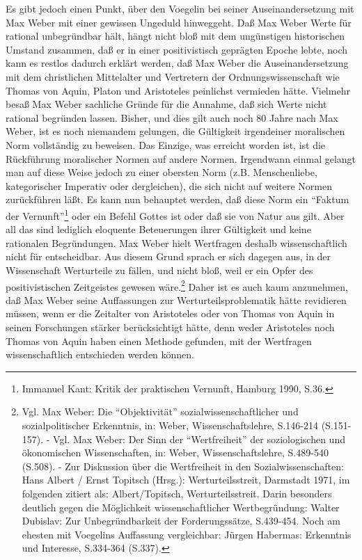 Es gibt jedoch einen Punkt, über den Voegelin bei seiner Auseinandersetzung
mit Max Weber mit einer gewissen Ungeduld hinweggeht. Daß Max Weber Werte für
rational unbegründbar hält, hängt nicht bloß mit dem ungünstigen historischen
Umstand zusammen, daß er in einer positivistisch geprägten Epoche lebte, noch
kann es restlos dadurch erklärt werden, daß Max Weber die Auseinandersetzung
mit dem christlichen Mittelalter und Vertretern der Ordnungswissenschaft wie
Thomas von Aquin, Platon und Aristoteles peinlichst vermieden hätte. Vielmehr
besaß Max Weber sachliche Gründe für die Annahme, daß sich Werte nicht
rational begründen lassen. Bisher, und dies gilt auch noch 80 Jahre nach Max
Weber, ist es noch niemandem gelungen, die Gültigkeit irgendeiner moralischen
Norm vollständig zu beweisen. Das Einzige, was erreicht worden ist, ist die
Rückführung moralischer Normen auf andere Normen. Irgendwann einmal gelangt
man auf diese Weise jedoch zu einer obersten Norm (z.B. Menschenliebe,
kategorischer Imperativ oder dergleichen), die sich nicht auf weitere Normen
zurückführen läßt. Es kann nun behauptet werden, daß diese Norm ein "`Faktum
der Vernunft"'\footnote{Immanuel Kant: Kritik der praktischen Vernunft,
  Hamburg 1990, S.36.} oder ein Befehl Gottes ist oder daß sie von Natur aus
gilt. Aber all das sind lediglich eloquente Beteuerungen ihrer Gültigkeit und
keine rationalen Begründungen. Max Weber hielt Wertfragen deshalb
wissenschaftlich nicht für entscheidbar. Aus diesem Grund sprach er sich
dagegen aus, in der Wissenschaft Werturteile zu fällen, und nicht bloß, weil
er ein Opfer des positivistischen Zeitgeistes gewesen wäre.\footnote{Vgl. Max
  Weber: Die "`Objektivität"' sozialwissenschaftlicher und sozialpolitischer
  Erkenntnis, in: Weber, Wissenschaftslehre, S.146-214 (S.151-157). - Vgl. Max
  Weber: Der Sinn der "`Wertfreiheit"' der soziologischen und ökonomischen
  Wissenschaften, in: Weber, Wissenschaftslehre, S.489-540 (S.508). - Zur
  Diskussion über die Wertfreiheit in den Sozialwissenschaften: Hans Albert /
  Ernst Topitsch (Hrsg.): Werturteilsstreit, Darmstadt 1971, im folgenden
  zitiert als: Albert/Topitsch, Werturteilsstreit. Darin besonders deutlich
  gegen die Möglichkeit wissenschaftlicher Wertbegründung: Walter Dubislav:
  Zur Unbegründbarkeit der Forderungssätze, S.439-454. Noch am ehesten mit
  Voegelins Auf\/fassung vergleichbar: Jürgen Habermas: Erkenntnis und
  Interesse, S.334-364 (S.337).} Daher ist es auch kaum anzunehmen, daß Max
Weber seine Auf\/fassungen zur Werturteilsproblematik hätte revidieren müssen,
wenn er die Zeitalter von Aristoteles oder von Thomas von Aquin in seinen
Forschungen stärker berücksichtigt hätte, denn weder Aristoteles noch Thomas
von Aquin haben einen Methode gefunden, mit der Wertfragen wissenschaftlich
entschieden werden können.

